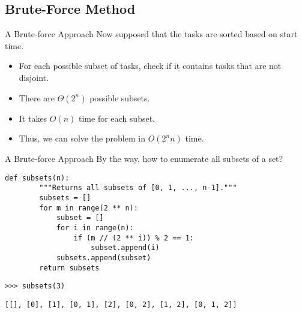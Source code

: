\documentclass{beamer}
\begin{document}
\subsection{Brute-Force Method}
\begin{frame}{A Brute-force Approach}
  Now supposed that the tasks are sorted based on start time. \pause
  \begin{itemize}
    \item For each possible subset of tasks, check if it contains tasks that
    are not disjoint. \pause
    \item There are $\Theta(2^n)$ possible subsets. \pause
    \item It takes $O(n)$ time for each subset. \pause
    \item Thus, we can solve the problem in $O(2^n n)$ time.
  \end{itemize}
\end{frame}

\begin{frame}[fragile]{A Brute-force Approach}
  By the way, how to enumerate all subsets of a set? \pause
  \begin{block}{}
    \scriptsize
    \begin{lstlisting}[gobble=4]
    def subsets(n):
        """Returns all subsets of [0, 1, ..., n-1]."""
        subsets = []
        for m in range(2 ** n):
            subset = []
            for i in range(n):
                if (m // (2 ** i)) % 2 == 1:
                    subset.append(i)
            subsets.append(subset)
        return subsets
    \end{lstlisting}
  \end{block}
  \pause
  \begin{block}{}
    \scriptsize
    \begin{lstlisting}[gobble=4]
    >>> subsets(3)
    \end{lstlisting}
    \pause
    \begin{lstlisting}[gobble=4]
    [[], [0], [1], [0, 1], [2], [0, 2], [1, 2], [0, 1, 2]]
    \end{lstlisting}
  \end{block}
\end{frame}
\end{document}
